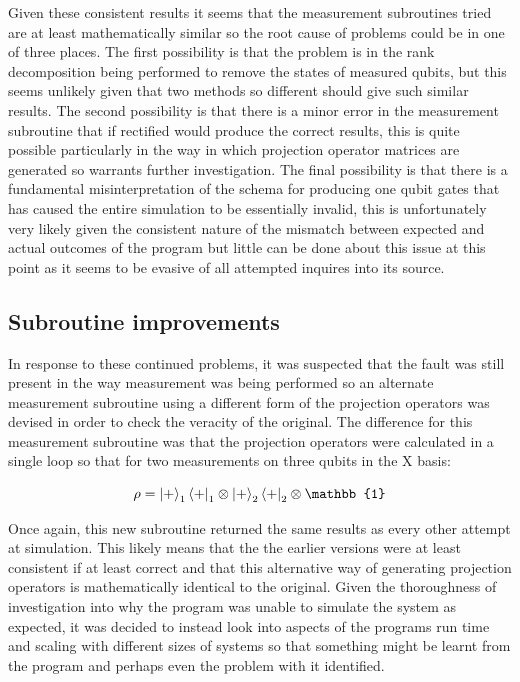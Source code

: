 Given these consistent results it seems that the measurement subroutines tried are at least mathematically similar so the root cause of problems could be in one of three places. The first possibility is that the problem is in the rank decomposition being performed to remove the states of measured qubits, but this seems unlikely given that two methods so different should give such similar results. 
The second possibility is that there is a minor error in the measurement subroutine that if rectified would produce the correct results, this is quite possible particularly in the way in which projection operator matrices are generated so warrants further investigation. The final possibility is that there is a fundamental misinterpretation of the schema for producing one qubit gates that has caused the entire simulation to be essentially invalid, this is unfortunately very likely given the consistent nature of the mismatch between expected and actual outcomes of the program but little can be done about this issue at this point as it seems to be evasive of all attempted inquires into its source. 


\subsection{Subroutine improvements}

In response to these continued problems, it was suspected that the fault was still present in the way measurement was being performed so an alternate measurement subroutine using a different form of the projection operators was devised in order to check the veracity of the original. The difference for this measurement subroutine was that the projection operators were calculated in a single loop so that for two measurements on three qubits in the X basis:

\begin{equation}
\rho = \ket{+}_{1} \bra{+}_{1} \otimes \ket{+}_{2} \bra{+}_{2} \otimes \mathbb{1}
\end{equation} 

Once again, this new subroutine returned the same results as every other attempt at simulation. This likely means that the the earlier versions were at least consistent if at least correct and that this alternative way of generating projection operators is mathematically identical to the original. Given the thoroughness of investigation into why the program was unable to simulate the system as expected, it was decided to instead look into aspects of the programs run time and scaling with different sizes of systems so that something might be learnt from the program and perhaps even the problem with it identified. 

